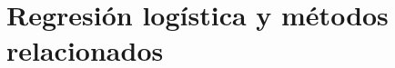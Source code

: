 \documentclass[10pt,a4paper]{book}
\begin{document}
    \chapter{Regresión logística y métodos relacionados}\label{cap:RegresionLogistica}
    









\end{document}
